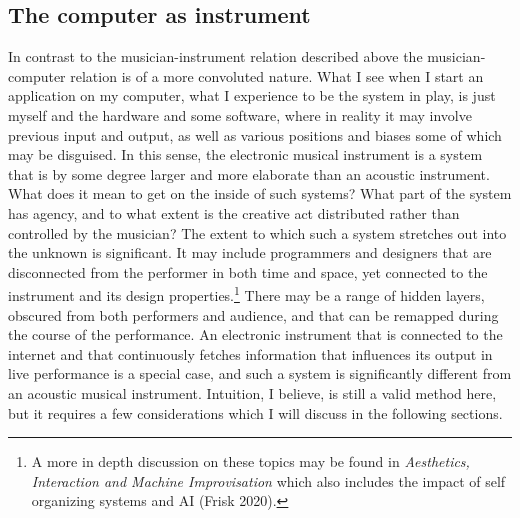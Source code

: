 \documentclass[11pt]{article}
\makeatletter
\newcommand{\cslcitation}[2]
 {\protect\hyper@linkstart{cite}{citeproc_bib_item_#1}#2\hyper@linkend}
\makeatother
\begin{document}
\subsection*{The computer as instrument}
\label{sec:orgf26879a}
In contrast to the musician-instrument relation described above the musician-computer relation is of a more convoluted nature.
What I see when I start an application on my computer, what I experience to be the system in play, is just myself and the hardware and some software, where in reality it may involve previous input and output, as well as various positions and biases some of which may be disguised.
In this sense, the electronic musical instrument is a system that is by some degree larger and more elaborate than an acoustic instrument.
What does it mean to get on the inside of such systems?
What part of the system has agency, and to what extent is the creative act distributed rather than controlled by the musician?
The extent to which such a system stretches out into the unknown is significant. 
It may include programmers and designers that are disconnected from the performer in both time and space, yet connected to the instrument and its design properties.\footnote{A more in depth discussion on these topics may be found in \emph{Aesthetics, Interaction and Machine Improvisation} which also includes the impact of self organizing systems and AI (\cslcitation{15}{Frisk 2020}).}
There may be a range of hidden layers, obscured from both performers and audience, and that can be remapped during the course of the performance.
An electronic instrument that is connected to the internet and that continuously fetches information that influences its output in live performance is a special case, and such a system is significantly different from an acoustic musical instrument.
Intuition, I believe, is still a valid method here, but it requires a few considerations which I will discuss in the following sections.
\end{document}

